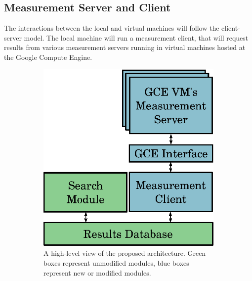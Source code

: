 \documentclass[a4paper, 12pt]{article}
\begin{document}
\subsection{Measurement Server and Client}

The interactions between the local and virtual machines will follow the
client-server model. The local machine will run a measurement client, that will
request results from various measurement servers running in virtual machines
hosted at the Google Compute Engine.

\begin{figure}[htpb]
    \centering
    \begin{subfigure}{.45\textwidth}
        \centering
        \includegraphics[scale=.62]{high-level-implementation}
        \caption{A high-level view of the proposed architecture.
        Green boxes represent unmodified modules, blue boxes represent
        new or modified modules.}
        \label{fig:high-level}
    \end{subfigure}%
    \hfill
    \begin{subfigure}{.45\textwidth}
        \centering

\end{subfigure}
\end{figure}
\end{document}
